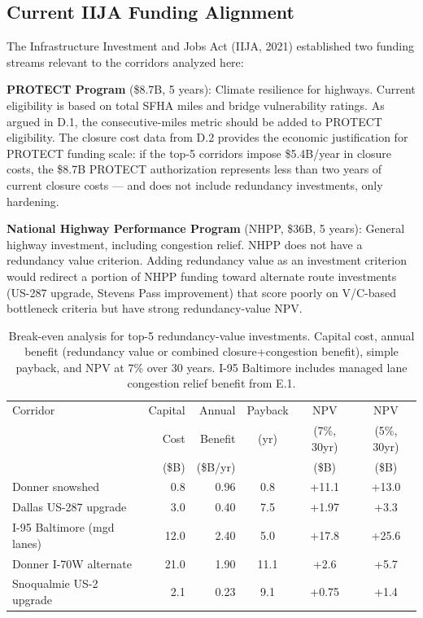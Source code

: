 \subsection{Current IIJA Funding Alignment}

The Infrastructure Investment and Jobs Act (IIJA, 2021) \citep{IIJA2021} established two
funding streams relevant to the corridors analyzed here:

\textbf{PROTECT Program} (\$8.7B, 5 years): Climate resilience for highways. Current
eligibility is based on total SFHA miles and bridge vulnerability ratings. As argued in
D.1, the consecutive-miles metric should be added to PROTECT eligibility. The closure
cost data from D.2 provides the economic justification for PROTECT funding scale: if the
top-5 corridors impose \$5.4B/year in closure costs, the \$8.7B PROTECT authorization
represents less than two years of current closure costs --- and does not include
redundancy investments, only hardening.

\textbf{National Highway Performance Program} (NHPP, \$36B, 5 years): General highway
investment, including congestion relief. NHPP does not have a redundancy value criterion.
Adding redundancy value as an investment criterion would redirect a portion of NHPP
funding toward alternate route investments (US-287 upgrade, Stevens Pass improvement)
that score poorly on V/C-based bottleneck criteria but have strong redundancy-value NPV.

\begin{table}[ht]
\centering
\caption{Break-even analysis for top-5 redundancy-value investments. Capital cost,
annual benefit (redundancy value or combined closure+congestion benefit), simple
payback, and NPV at 7\% over 30 years. I-95 Baltimore includes managed lane
congestion relief benefit from E.1.}
\label{tab:break-even}
\begin{tabular}{@{}lrrccc@{}}
\toprule
Corridor & Capital & Annual & Payback & NPV & NPV \\
         & Cost    & Benefit & (yr) & (7\%, 30yr) & (5\%, 30yr) \\
         & (\$B)   & (\$B/yr) &    & (\$B) & (\$B) \\
\midrule
Donner snowshed          & 0.8  & 0.96 &  0.8 & +11.1 & +13.0 \\
Dallas US-287 upgrade    & 3.0  & 0.40 &  7.5 &  +1.97 & +3.3 \\
I-95 Baltimore (mgd lanes) & 12.0 & 2.40 & 5.0 & +17.8 & +25.6 \\
Donner I-70W alternate   & 21.0 & 1.90 & 11.1 &  +2.6 & +5.7 \\
Snoqualmie US-2 upgrade  &  2.1 & 0.23 &  9.1 &  +0.75 & +1.4 \\
\bottomrule
\end{tabular}
\end{table}

